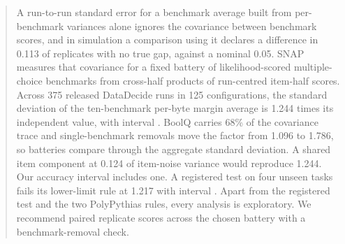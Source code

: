 \begin{abstract}
A run-to-run standard error for a benchmark average built from per-benchmark variances alone ignores the covariance between benchmark scores, and in simulation a comparison using it declares a difference in 0.113 of replicates with no true gap, against a nominal 0.05. SNAP measures that covariance for a fixed battery of likelihood-scored multiple-choice benchmarks from cross-half products of run-centred item-half scores. Across 375 released DataDecide runs in 125 configurations, the standard deviation of the ten-benchmark per-byte margin average is 1.244 times its independent value, with interval . BoolQ carries 68\% of the covariance trace and single-benchmark removals move the factor from 1.096 to 1.786, so batteries compare through the aggregate standard deviation. A shared item component at 0.124 of item-noise variance would reproduce 1.244. Our accuracy interval  includes one. A registered test on four unseen tasks fails its lower-limit rule at 1.217 with interval .  Apart from the registered test and the two PolyPythias rules, every analysis is exploratory. We recommend paired replicate scores across the chosen battery with a benchmark-removal check.
\end{abstract}

